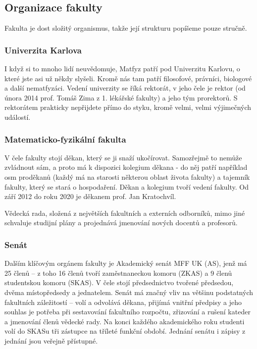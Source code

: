 \subsection{Organizace fakulty}
Fakulta je dost složitý organismus,
takže její strukturu popíšeme pouze stručně.


\subsubsection{Univerzita Karlova}
I když si to mnoho lidí neuvědomuje, Matfyz patří pod Univerzitu Karlovu, o
které jste asi už někdy slyšeli. Kromě nás tam patří filosofové, právníci,
biologové a další nematfyzáci. Vedení univerzity se říká rektorát, v jeho čele
je rektor (od února 2014 prof. Tomáš Zima z 1. lékářské fakulty) a jeho tým
prorektorů. S rektorátem prakticky nepřijdete přímo do styku, kromě velmi,
velmi výjimečných událostí.


\subsubsection{Matematicko-fyzikální fakulta}
V čele fakulty stojí děkan, který se ji snaží ukočírovat. Samozřejmě to nemůže zvládnout sám, a proto má k dispozici kolegium děkana - do něj patří například osm proděkanů (každý má na starosti některou oblast života fakulty) a tajemník fakulty, který se stará o hospodaření. Děkan a kolegium tvoří vedení fakulty. Od září 2012 do roku 2020 je děkanem prof. Jan Kratochvíl.

Vědecká rada, složená z největších fakultních a externích odborníků, mimo jiné schvaluje studijní plány a projednává jmenování nových docentů a profesorů.


\subsubsection{Senát}
Dalším klíčovým orgánem fakulty je Akademický senát MFF UK (AS), jenž má 25 členů – z toho 16 členů tvoří zaměstnaneckou komoru (ZKAS) a 9 členů studentskou komoru (SKAS). V čele stojí předsednictvo tvořené předsedou, dvěma místopředsedy a jednatelem. Senát má značný vliv na většinu podstatných fakultních záležitostí – volí a odvolává děkana, přijímá vnitřní předpisy a jeho souhlas je potřeba při sestavování fakultního rozpočtu, zřizování a rušení kateder a jmenování členů vědecké rady. Na konci každého akademického roku studenti volí do SKASu tři zástupce na tříleté funkční období. Jednání senátu i zápisy z jednání jsou veřejně přístupné.


